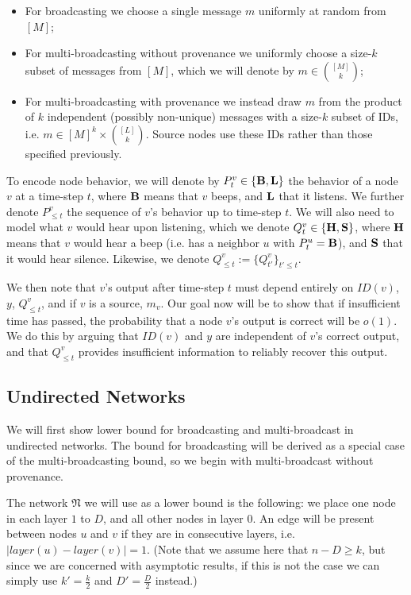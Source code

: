 \documentclass{article}
\newcommand{\net}{\ensuremath{\mathfrak{N}}\xspace}
\begin{document}
\begin{itemize}
	\item For broadcasting we choose a single message $m$ uniformly at random from $[M]$;
	\item For multi-broadcasting without provenance we uniformly choose a size-$k$ subset of messages from $[M]$, which we will denote by $m\in \binom{[M]}{k}$;
	\item For multi-broadcasting with provenance we instead draw $m$ from the product of $k$ independent (possibly non-unique) messages with a size-$k$ subset of IDs, i.e. $m\in [M]^k\times \binom{[L]}{k}$. Source nodes use these IDs rather than those specified previously.
\end{itemize}

To encode node behavior, we will denote by $P^v_t \in \{\textbf B, \textbf L \}$ the behavior of a node $v$ at a time-step $t$, where $\textbf B$ means that $v$ beeps, and $\textbf L$ that it listens. We further denote $P^v_{\leq t}$ the sequence of $v$'s behavior up to time-step $t$.
We will also need to model what $v$ would hear upon listening, which we denote $Q^v_t\in \{\textbf H, \textbf S \}$, where $\textbf H$ means that $v$ would hear a beep (i.e. has a neighbor $u$ with $P^u_t = \textbf B$), and $\textbf S$ that it would hear silence. Likewise, we denote $Q^v_{\leq t}:= \{Q^v_{t'}\}_{t'\leq t}$.

We then note that $v$'s output after time-step $t$ must depend entirely on $ID(v)$, $y$, $Q^v_{\leq t}$, and if $v$ is a source, $m_v$. Our goal now will be to show that if insufficient time has passed, the probability that a node $v$'s output is correct will be $o(1)$. We do this by arguing that $ID(v)$ and $y$ are independent of $v$'s correct output, and that $Q^v_{\leq t}$ provides insufficient information to reliably recover this output.

\subsection{Undirected Networks}
We will first show lower bound for broadcasting and multi-broadcast in undirected networks. The bound for broadcasting will be derived as a special case of the multi-broadcasting bound, so we begin with multi-broadcast without provenance.

The network $\net$ we will use as a lower bound is the following: we place one node in each layer $1$ to $D$, and all other nodes in layer $0$. An edge will be present between nodes $u$ and $v$ if they are in consecutive layers, i.e. $|layer(u)-layer(v)|=1$. (Note that we assume here that $n-D\geq k$, but since we are concerned with asymptotic results, if this is not the case we can simply use $k'=\frac k2$ and $D'=\frac D2$ instead.)
\end{document}
